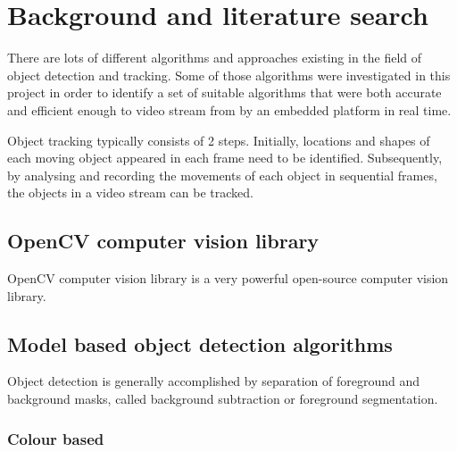 \chapter{Background and literature search}

There are lots of different algorithms and approaches existing in the field of object detection and tracking. Some of those algorithms were investigated in this project in order to identify a set of suitable algorithms that were both accurate and efficient enough to  video stream from  by an embedded platform in real time.

Object tracking typically consists of 2 steps. Initially, locations and shapes of each moving object appeared in each frame need to be identified. Subsequently, by analysing and recording the movements of each object in sequential frames, the objects in a video stream can be tracked.

\section{OpenCV computer vision library}


OpenCV computer vision library \cite{opencv} is a very powerful open-source computer vision library. 

\section{Model based object detection algorithms}

\iffalse
Being able to detect objects in a video frame is the first, also the most important and challenging step to do object tracking. This is generally accomplished by separation of foreground objects and background image.
\fi

Object detection is generally accomplished by separation of foreground and background masks, called background subtraction or foreground segmentation.

\subsection{Colour based}
\label{bgs:colour}

